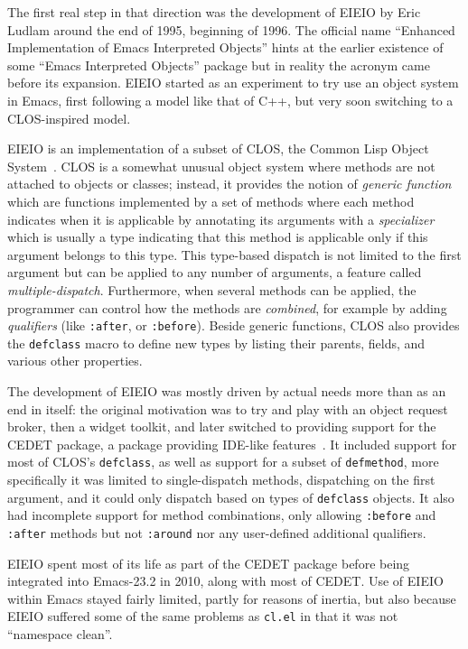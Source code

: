 \documentclass[format=acmsmall, review]{acmart}
\begin{document}
The first real step in that direction was the development of EIEIO by Eric
Ludlam around the end of 1995, beginning of 1996.  The official name ``Enhanced
Implementation of Emacs Interpreted Objects'' hints at the earlier existence
of some ``Emacs Interpreted Objects'' package but in reality the acronym
came before its expansion.  EIEIO started as an experiment to try use
an object system in Emacs, first following a model like that of C++, but
very soon switching to a CLOS-inspired model.


EIEIO is an implementation of a subset of CLOS, the Common Lisp Object
System~\cite{DeMichielGabriel1987}.  CLOS is a somewhat unusual object
system where methods are not attached to objects or classes; instead, it
provides the notion of \emph{generic function} which are functions
implemented by a set of methods where each method indicates when it is
applicable by annotating its arguments with a \emph{specializer} which is
usually a type indicating that this method is applicable only if this
argument belongs to this type.  This type-based dispatch is not limited to
the first argument but can be applied to any number of arguments, a feature
called \emph{multiple-dispatch}.  Furthermore, when several methods can be
applied, the programmer can control how the methods are \emph{combined}, for
example by adding \emph{qualifiers} (like \texttt{:after}, or
\texttt{:before}).  Beside generic functions, CLOS also provides the
\texttt{defclass} macro to define new types by listing their parents,
fields, and various other properties.

The development of EIEIO was mostly
driven by actual needs more than as an end in itself: the original
motivation was to try and play with an object request broker, then a widget
toolkit, and later switched to providing support for the CEDET
package, a package providing IDE-like features~\cite{Ludlam18}.
It included support for most of CLOS's \texttt{defclass}, as well as support
for a subset of \texttt{defmethod}, more specifically it was limited to
single-dispatch methods, dispatching on the first argument, and it could
only dispatch based on types of \texttt{defclass} objects.  It also had
incomplete support for method combinations, only allowing \texttt{:before}
and \texttt{:after} methods but not \texttt{:around} nor any user-defined
additional qualifiers.

EIEIO spent most of its life as part of the CEDET package
before being integrated into Emacs-23.2 in
2010, along with most of CEDET.  Use of EIEIO within Emacs stayed fairly
limited, partly for reasons of inertia, but also because EIEIO suffered some
of the same problems as \texttt{cl.el} in that it was not
``namespace clean''.
\end{document}

